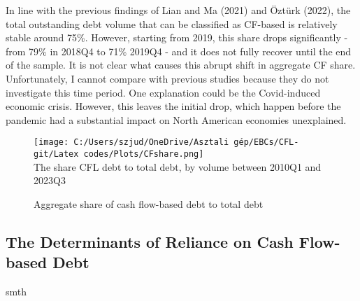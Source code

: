 \documentclass[12pt]{article}
\begin{document}
\noindent In line with the previous findings of Lian and Ma (2021) and Öztürk (2022), the total outstanding debt volume that can be classified as CF-based is relatively stable around 75\%. However, starting from 2019, this share drops significantly - from 79\% in 2018Q4 to 71\% 2019Q4 - and it does not fully recover until the end of the sample. It is not clear what causes this abrupt shift in aggregate CF share. Unfortunately, I cannot compare with previous studies because they do not investigate this time period. One explanation could be the Covid-induced economic crisis. However, this leaves the initial drop, which happen before the pandemic had a substantial impact on North American economies unexplained. 

\begin{figure}[H]  %
    \centering
    \caption{Aggregate share of cash flow-based debt to total debt} \label{chart:CFLshare}
    \texttt{[image: C:/Users/szjud/OneDrive/Asztali gép/EBCs/CFL-git/Latex codes/Plots/CFshare.png]} \\
     \small The share CFL debt to total debt, by volume between 2010Q1 and 2023Q3
\end{figure}
\subsection{The Determinants of Reliance on Cash Flow-based Debt \label{sec:CFshare}}
smth
\end{document}

